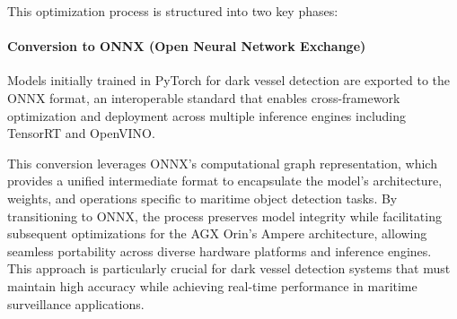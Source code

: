\documentclass{article}
\begin{document}
	This optimization process is structured into two key phases:
	
	\paragraph{Conversion to ONNX (Open Neural Network Exchange)}
	Models initially trained in PyTorch for dark vessel detection are exported to the ONNX format, an interoperable standard that enables cross-framework optimization and deployment across multiple inference engines including TensorRT and OpenVINO. 
	
	This conversion leverages ONNX's computational graph representation, which provides a unified intermediate format to encapsulate the model's architecture, weights, and operations specific to maritime object detection tasks. By transitioning to ONNX, the process preserves model integrity while facilitating subsequent optimizations for the AGX Orin's Ampere architecture, allowing seamless portability across diverse hardware platforms and inference engines. This approach is particularly crucial for dark vessel detection systems that must maintain high accuracy while achieving real-time performance in maritime surveillance applications. 
	
	
\end{document}
